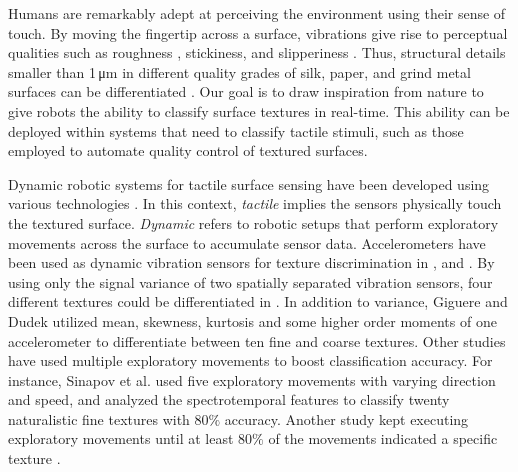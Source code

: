 Humans are remarkably adept at perceiving the environment using their sense of touch. By moving the fingertip across a surface, vibrations give rise to perceptual qualities such as roughness \citep{unger2013physical}, stickiness, and slipperiness \citep{klatzky2013haptic, holliins1993perceptual}. Thus, structural details smaller than 1\,\si{\micro\meter} in different quality grades of silk, paper, and grind metal surfaces can be differentiated \citep{weber2013spatial}.
Our goal is to draw inspiration from nature to give robots the ability to classify surface textures in real-time. This ability can be deployed within systems that need to classify tactile stimuli, such as those employed to automate quality control of textured surfaces. 


Dynamic robotic systems for tactile surface sensing have been developed using various technologies \citep{dahiya2010tactile}. In this context, \textit{tactile} implies the sensors physically touch the textured surface. \textit{Dynamic} refers to robotic setups that perform exploratory movements across the surface to accumulate sensor data. %
Accelerometers have been used as dynamic vibration sensors for texture discrimination in %
\citep{howe1993dynamic}, \citep{giguere2011simple} %
and \citep{sinapov2011vibrotactile}. 
By using only the signal variance of two spatially separated vibration sensors, four different textures could be differentiated in \citep{tada2004sensing}. In addition to variance, Giguere and Dudek \citep{giguere2011simple} utilized mean, skewness, kurtosis and some higher order moments of one accelerometer to differentiate between ten fine and coarse textures. 
Other studies have used multiple exploratory movements to boost classification accuracy. For instance, Sinapov et al. \citep{sinapov2011vibrotactile} used five exploratory movements with varying direction and speed, and analyzed the spectrotemporal features to classify twenty naturalistic fine textures with $80\%$ accuracy. Another study kept executing exploratory movements until at least $80\%$ of the movements indicated a specific texture \citep{jamali2011majority}.


